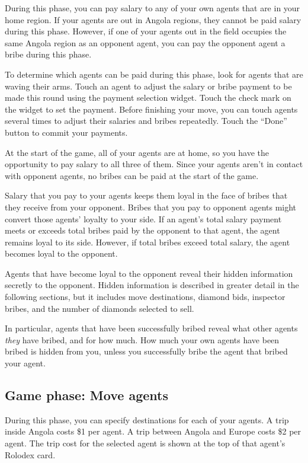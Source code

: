 \documentclass[8pt]{extbook}
\begin{document}
During this phase, you can pay salary to any of your own agents that are in your home region.  If your agents are out in Angola regions, they cannot be paid salary during this phase.  However, if one of your agents out in the field occupies the same Angola region as an opponent agent, you can pay the opponent agent a bribe during this phase.

To determine which agents can be paid during this phase, look for agents that are waving their arms.  Touch an agent to adjust the salary or bribe payment to be made this round using the payment selection widget.  Touch the check mark on the widget to set the payment.  Before finishing your move, you can touch agents several times to adjust their salaries and bribes repeatedly.  Touch the ``Done'' button to commit your payments. 

At the start of the game, all of your agents are at home, so you have the opportunity to pay salary to all three of them.  Since your agents aren't in contact with opponent agents, no bribes can be paid at the start of the game.

Salary that you pay to your agents keeps them loyal in the face of bribes that they receive from your opponent.  Bribes that you pay to opponent agents might convert those agents' loyalty to your side.  If an agent's total salary payment meets or exceeds total bribes paid by the opponent to that agent, the agent remains loyal to its side.  However, if total bribes exceed total salary, the agent becomes loyal to the opponent.

Agents that have become loyal to the opponent reveal their hidden information secretly to the opponent.  Hidden information is described in greater detail in the following sections, but it includes move destinations, diamond bids, inspector bribes, and the number of diamonds selected to sell.

In particular, agents that have been successfully bribed reveal what other agents {\it they} have bribed, and for how much.  How much your own agents have been bribed is hidden from you, unless you successfully bribe the agent that bribed your agent.

\subsection{Game phase:  Move agents}
\label{sec:movePhase}

During this phase, you can specify destinations for each of your agents.  A trip inside Angola costs \$1 per agent.  A trip between Angola and Europe costs \$2 per agent.  The trip cost for the selected agent is shown at the top of that agent's Rolodex card.
\end{document}
